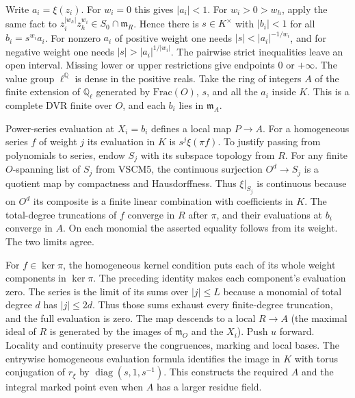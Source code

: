 Write $a_i=\xi(z_i)$. For $w_i=0$ this gives $|a_i|<1$.
For $w_i>0>w_h$, apply the same fact to
$z_i^{|w_h|}z_h^{w_i}\in S_0\cap\mathfrak m_R$.
Hence there is $s\in K^\times$ with $|b_i|<1$ for all
$b_i=s^{w_i}a_i$. For nonzero $a_i$ of positive weight one needs
$|s|<|a_i|^{-1/w_i}$, and for negative weight one needs
$|s|>|a_i|^{1/|w_i|}$. The pairwise strict inequalities leave an
open interval. Missing lower or upper restrictions give endpoints
$0$ or $+\infty$. The value group $\ell^{\mathbb Q}$ is dense
in the positive reals. Take the ring of integers $A$ of the finite
extension of $\mathbb Q_\ell$ generated by $\mathrm{Frac}(O)$, $s$,
and all the $a_i$ inside $K$. This is a complete DVR finite over
$O$, and each $b_i$ lies in $\mathfrak m_A$.

Power-series evaluation at $X_i=b_i$ defines a local map
$P\to A$. For a homogeneous series $f$ of weight $j$ its evaluation
in $K$ is $s^j\xi(\pi f)$. To justify passing from polynomials to
series, endow $S_j$ with its subspace topology from $R$. For any
finite $O$-spanning list of $S_j$ from VSCM5, the continuous
surjection $O^d\to S_j$ is a quotient map by compactness and
Hausdorffness. Thus $\xi|_{S_j}$ is continuous because on $O^d$ its
composite is a finite linear combination with coefficients in $K$.
The total-degree truncations of $f$ converge in $R$ after $\pi$,
and their evaluations at $b_i$ converge in $A$. On each monomial
the asserted equality follows from its weight. The two limits agree.

For $f\in\ker\pi$, the homogeneous kernel condition puts each of
its whole weight components in $\ker\pi$. The preceding identity
makes each component's evaluation zero. The series is the limit
of its sums over $|j|\le L$ because a monomial of total degree $d$
has $|j|\le 2d$. Thus those sums exhaust every finite-degree
truncation, and the full evaluation is zero. The map descends to a
local $R\to A$ (the maximal ideal of $R$ is generated by the images
of $\mathfrak m_O$ and the $X_i$). Push $u$ forward. Locality and
continuity preserve the congruences, marking and local bases.
The entrywise homogeneous evaluation formula identifies the image in
$K$ with torus conjugation of $r_\xi$ by $\operatorname{diag}(s,1,s^{-1})$.
This constructs the required $A$ and the integral marked point even
when $A$ has a larger residue field.

